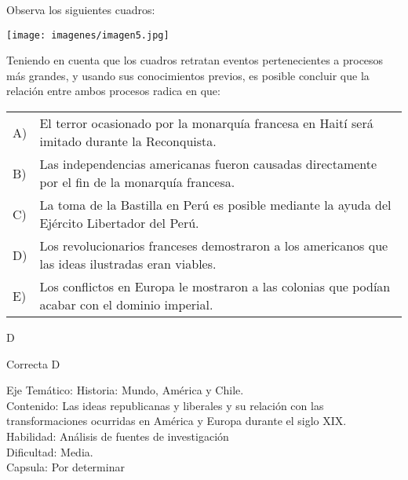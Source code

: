 \documentclass[letterpaper,11pt]{article}
\newcommand{\anchopregunta}{0.9\textwidth}
\begin{document}
\begin{enumerate}
\begin{minipage}{\anchopregunta}
\item Observa los siguientes cuadros:
\begin{center}
    \texttt{[image: imagenes/imagen5.jpg]}
\end{center}
Teniendo en cuenta que los cuadros retratan eventos pertenecientes a procesos más grandes, y usando sus conocimientos previos, es posible concluir que la relación entre ambos procesos radica en que:
\begin{flushleft}\begin{tabular}{@{\hspace{-.001\textwidth}}l@{\hspace{2pt}}p{}}
A)& El terror ocasionado por la monarquía francesa en Haití será imitado durante la Reconquista.\\
B)& Las independencias americanas fueron causadas directamente por el fin de la monarquía francesa. \\
C)& La toma de la Bastilla en Perú es posible mediante la ayuda del Ejército Libertador del Perú.\\
D)& Los revolucionarios franceses demostraron a los americanos que las ideas ilustradas eran viables. \\
E)& Los conflictos en Europa le mostraron a las colonias que podían acabar con el dominio imperial. \\ 
\end{tabular}\end{flushleft}%
\begin{key} D
\end{key} 
\begin{hint}
\end{hint}
\begin{answer} Correcta D \\
\end{answer}
\begin{info} %
\begin{flushleft}
Eje Temático: Historia: Mundo, América y Chile.\\
Contenido: Las ideas republicanas y liberales y su relación con las transformaciones
ocurridas en América y Europa durante el siglo XIX.\\
Habilidad: Análisis de fuentes de investigación\\
Dificultad: Media.\\
Capsula: Por determinar \\
\end{flushleft} 
\end{info}
\end{minipage}\vfill$\;$ %


\end{enumerate}
\end{document}
